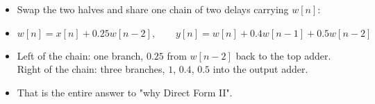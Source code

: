 \begin{itemize}
  \item Swap the two halves and share one chain of two delays carrying $w[n]$:
  \item[] \[ w[n]=x[n]+0.25w[n-2],\qquad y[n]=w[n]+0.4w[n-1]+0.5w[n-2] \]
  \item Left of the chain: one branch, $0.25$ from $w[n-2]$ back to the top adder.
        Right of the chain: three branches, $1$, $0.4$, $0.5$ into the output adder.
  \item {} That is the entire answer to
        "why Direct Form II".
\end{itemize}

\par\smallskip
